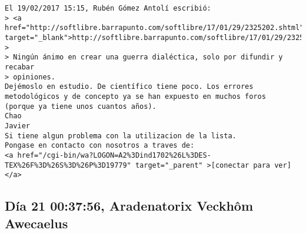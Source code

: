 \documentclass[a4paper,10pt]{article}
\begin{document}
\begin{lstlisting}
El 19/02/2017 15:15, Rubén Gómez Antolí escribió:
> <a href="http://softlibre.barrapunto.com/softlibre/17/01/29/2325202.shtml" target="_blank">http://softlibre.barrapunto.com/softlibre/17/01/29/2325202.shtml</a>
>
> Ningún ánimo en crear una guerra dialéctica, solo por difundir y recabar
> opiniones.
Dejémoslo en estudio. De científico tiene poco. Los errores
metodológicos y de concepto ya se han expuesto en muchos foros
(porque ya tiene unos cuantos años).
Chao
Javier
Si tiene algun problema con la utilizacion de la lista.
Pongase en contacto con nosotros a traves de:
<a href="/cgi-bin/wa?LOGON=A2%3Dind1702%26L%3DES-TEX%26F%3D%26S%3D%26P%3D19779" target="_parent" >[conectar para ver]</a>

\end{lstlisting}

\subsection{Día 21 00:37:56, Aradenatorix Veckhôm Awecaelus}
\end{document}
